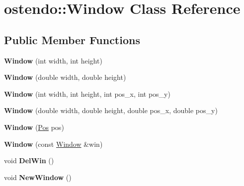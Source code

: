 \hypertarget{classostendo_1_1Window}{}\section{ostendo\+:\+:Window Class Reference}
\label{classostendo_1_1Window}
\subsection*{Public Member Functions}
\begin{DoxyCompactItemize}
\item 
\mbox{\label{classostendo_1_1Window_a080f0b58aef84dbda345d1f8b3591871}} 
{\bfseries Window} (int width, int height)
\item 
\mbox{\label{classostendo_1_1Window_a61857975d28428c0086f13180b582617}} 
{\bfseries Window} (double width, double height)
\item 
\mbox{\label{classostendo_1_1Window_a08054b16a51c101ea55ec27f628a88c3}} 
{\bfseries Window} (int width, int height, int pos\+\_\+x, int pos\+\_\+y)
\item 
\mbox{\label{classostendo_1_1Window_ab6788bb11963c0985833e93102e06b54}} 
{\bfseries Window} (double width, double height, double pos\+\_\+x, double pos\+\_\+y)
\item 
\mbox{\label{classostendo_1_1Window_a24f1dce7d66fb8ffec6d36e191656ec9}} 
{\bfseries Window} (\hyperlink{structostendo_1_1Pos}{Pos} pos)
\item 
\mbox{\label{classostendo_1_1Window_a28c857e8a69f68ee27b291e72e1053fb}} 
{\bfseries Window} (const \hyperlink{classostendo_1_1Window}{Window} \&win)
\item 
\mbox{\label{classostendo_1_1Window_a4d2cdcaf3c4a781e7c0e46b52c693e54}} 
void {\bfseries Del\+Win} ()
\item 
\mbox{\label{classostendo_1_1Window_a34de0bce2e7291c403dc0118309095fe}} 
void {\bfseries New\+Window} ()
\item 

\end{DoxyCompactItemize}
